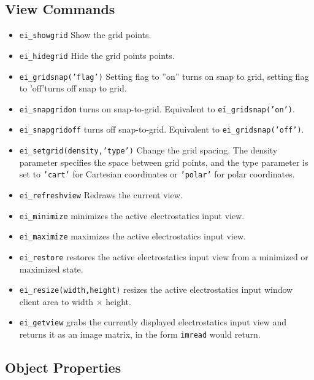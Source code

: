 \subsection{View Commands}
\begin{itemize}
\item \texttt{ei\_showgrid} Show the grid points.

\item \texttt{ei\_hidegrid} Hide the grid points points.

\item \texttt{ei\_gridsnap('flag')} Setting flag to ''on'' turns on snap to grid,
setting flag to 'off'turns off snap to grid.

\item{\tt ei\_snapgridon} turns on snap-to-grid. Equivalent to {\tt ei\_gridsnap('on')}.

\item{\tt ei\_snapgridoff} turns off snap-to-grid. Equivalent to {\tt ei\_gridsnap('off')}.

\item \texttt{ei\_setgrid(density,'type')} Change the grid spacing. The density
parameter specifies the space between grid points, and the type
parameter is set to \texttt{'cart'} for Cartesian coordinates or
\texttt{'polar'} for polar coordinates.

\item \texttt{ei\_refreshview} Redraws the current view.

\item{\tt ei\_minimize} minimizes the active electrostatics input view.
\item{\tt ei\_maximize} maximizes the active electrostatics input view.
\item{\tt ei\_restore} restores the active electrostatics input view from a
 minimized or maximized state.
\item{\tt ei\_resize(width,height)} resizes the active electrostatics input
 window client area to width $\times$ height.
\item{\tt ei\_getview} grabs the currently displayed electrostatics input view and
 returns it as an image matrix, in the form \texttt{imread} would return.
\end{itemize}




\subsection{Object Properties}

